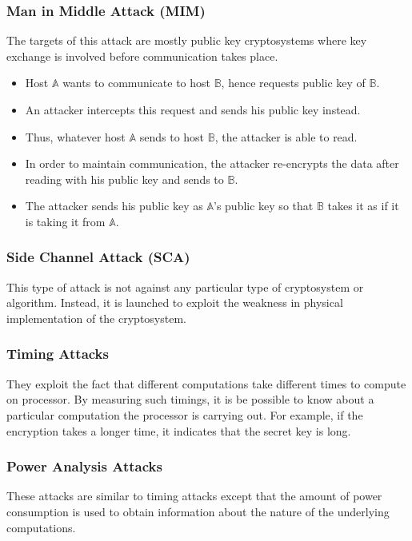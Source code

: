 \documentclass[british]{article}
\begin{document}
\subsubsection{Man in Middle Attack (MIM)}

The targets of this attack are mostly public key cryptosystems where
key exchange is involved before communication takes place.
\begin{itemize}
\item Host $\mathbb{A}$ wants to communicate to host $\mathbb{B}$, hence
requests public key of $\mathbb{B}$.
\item An attacker intercepts this request and sends his public key instead.
\item Thus, whatever host $\mathbb{A}$ sends to host $\mathbb{B}$, the
attacker is able to read.
\item In order to maintain communication, the attacker re-encrypts the data
after reading with his public key and sends to $\mathbb{B}$.
\item The attacker sends his public key as $\mathbb{A}$'s public key so
that $\mathbb{B}$ takes it as if it is taking it from $\mathbb{A}$.
\end{itemize}

\subsubsection{Side Channel Attack (SCA)}

This type of attack is not against any particular type of cryptosystem
or algorithm. Instead, it is launched to exploit the weakness in physical
implementation of the cryptosystem.

\subsubsection{Timing Attacks}

They exploit the fact that different computations take different times
to compute on processor. By measuring such timings, it is be possible
to know about a particular computation the processor is carrying out.
For example, if the encryption takes a longer time, it indicates that
the secret key is long.

\subsubsection{Power Analysis Attacks}

These attacks are similar to timing attacks except that the amount
of power consumption is used to obtain information about the nature
of the underlying computations.
\end{document}
